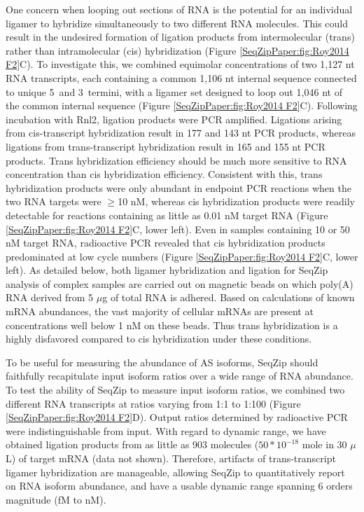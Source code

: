 		One concern when looping out sections of RNA is the potential for an individual ligamer to hybridize simultaneously to two different RNA molecules. This could result in the undesired formation of ligation products from intermolecular (trans) rather than intramolecular (cis) hybridization (Figure \ref{SeqZipPaper:fig:Roy2014 F2}C). To investigate this, we combined equimolar concentrations of two 1,127 nt RNA transcripts, each containing a common 1,106 nt internal sequence connected to unique 5\textprime~and 3\textprime~termini, with a ligamer set designed to loop out 1,046 nt of the common internal sequence (Figure \ref{SeqZipPaper:fig:Roy2014 F2}C). Following incubation with Rnl2, ligation products were PCR amplified. Ligations arising from cis-transcript hybridization result in 177 and 143 nt PCR products, whereas ligations from trans-transcript hybridization result in 165 and 155 nt PCR products. Trans hybridization efficiency should be much more sensitive to RNA concentration than cis hybridization efficiency. Consistent with this, trans hybridization products were only abundant in endpoint PCR reactions when the two RNA targets were $\ge$10 nM, whereas cis hybridization products were readily detectable for reactions containing as little as 0.01 nM target RNA (Figure \ref{SeqZipPaper:fig:Roy2014 F2}C, lower left). Even in samples containing 10 or 50 nM target RNA, radioactive PCR revealed that cis hybridization products predominated at low cycle numbers (Figure \ref{SeqZipPaper:fig:Roy2014 F2}C, lower left). As detailed below, both ligamer hybridization and ligation for SeqZip analysis of complex samples are carried out on magnetic beads on which poly(A) RNA derived from 5 $\mu$g of total RNA is adhered. Based on calculations of known mRNA abundances, the vast majority of cellular mRNAs are present at concentrations well below 1 nM on these beads. Thus trans hybridization is a highly disfavored compared to cis hybridization under these conditions.

		To be useful for measuring the abundance of AS isoforms, SeqZip should faithfully recapitulate input isoform ratios over a wide range of RNA abundance. To test the ability of SeqZip to measure input isoform ratios, we combined two different RNA transcripts at ratios varying from 1:1 to 1:100 (Figure \ref{SeqZipPaper:fig:Roy2014 F2}D). Output ratios determined by radioactive PCR were indistinguishable from input. With regard to dynamic range, we have obtained ligation products from as little as 903 molecules ($50 * 10^{-18}$ mole in 30 $\mu$L) of target mRNA (data not shown). Therefore, artifacts of trans-transcript ligamer hybridization are manageable, allowing SeqZip to quantitatively report on RNA isoform abundance, and have a usable dynamic range spanning 6 orders magnitude (fM to nM).

